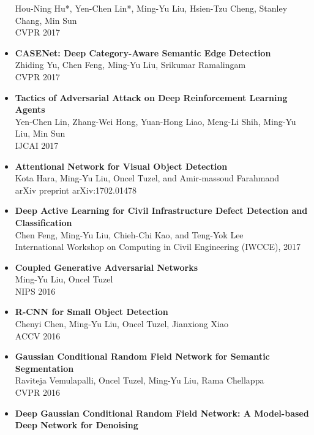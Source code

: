 \begin{itemize}
      Hou-Ning Hu*, Yen-Chen Lin*, Ming-Yu Liu, Hsien-Tzu Cheng, Stanley Chang, Min Sun\\
      CVPR 2017\vspace{-2mm}
\item {\bf CASENet: Deep Category-Aware Semantic Edge Detection}\\
      Zhiding Yu, Chen Feng, Ming-Yu Liu, Srikumar Ramalingam\\
      CVPR 2017\vspace{-2mm}
\item {\bf Tactics of Adversarial Attack on Deep Reinforcement Learning Agents}\\
      Yen-Chen Lin, Zhang-Wei Hong, Yuan-Hong Liao, Meng-Li Shih, Ming-Yu Liu, Min Sun\\
      IJCAI 2017\vspace{-2mm}      
\item {\bf Attentional Network for Visual Object Detection}\\
      Kota Hara, Ming-Yu Liu, Oncel Tuzel, and Amir-massoud Farahmand\\
      arXiv preprint arXiv:1702.01478\vspace{-2mm}
\item {\bf Deep Active Learning for Civil Infrastructure Defect Detection and Classification}\\
      Chen Feng, Ming-Yu Liu, Chieh-Chi Kao, and Teng-Yok Lee\\
      International Workshop on Computing in Civil Engineering (IWCCE), 2017\vspace{-2mm}
\item {\bf Coupled Generative Adversarial Networks}\\
      Ming-Yu Liu, Oncel Tuzel\\
      NIPS 2016\vspace{-2mm}
\item {\bf R-CNN for Small Object Detection}\\
      Chenyi Chen, Ming-Yu Liu, Oncel Tuzel, Jianxiong Xiao\\
      ACCV 2016\vspace{-2mm}      
\item {\bf Gaussian Conditional Random Field Network for Semantic Segmentation}\\
      Raviteja Vemulapalli, Oncel Tuzel, Ming-Yu Liu, Rama Chellappa\\
      CVPR 2016\vspace{-2mm}
\item {\bf Deep Gaussian Conditional Random Field Network: A Model-based Deep Network for Denoising}\\

\end{itemize}
